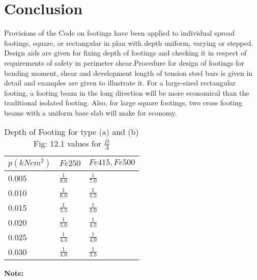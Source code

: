 \documentclass{book}
\begin{document}
\section{Conclusion}
Provisions of the Code on footings have been applied to individual spread footings, square, or rectangular in plan with depth uniform, varying or stepped. Design aids are given for ﬁxing depth of footings and checking it in respect of requirements of safety in perimeter shear.Procedure for design of footings for bending moment, shear and development length of tension steel bars is given in detail and examples are given to illustrate it. For a large-sized rectangular footing, a footing beam in the long direction will be more economical than the traditional isolated footing. Also, for large square footings, two cross footing beams with a uniform base slab will make for economy.

\begin{table}
\centering
\label{Table 12.1}
\caption{Depth of Footing for type (a) and (b) Fig: 12.1 values for $\frac{D}{A}$}
\begin{tabular}{ |p{3cm}||p{3cm}|p{3cm}|}
 \hline
 $p(kN cm^2)$ & $Fe 250$ & $Fe 415, Fe 500$\\[0.8 ex]
 \hline
 0.005 &$\frac{1}{8.0}$ &$\frac{1}{7.0}$\\[0.5 ex]
 0.010 &$\frac{1}{6.0}$ &$\frac{1}{5.5}$\\[0.5 ex]
 0.015&$\frac{1}{5.5}$ &$\frac{1}{5.0}$\\[0.5 ex]
 0.020 &$\frac{1}{5.0}$ &$\frac{1}{4.5}$\\[0.5 ex]
 0.025 &$\frac{1}{4.5}$ &$\frac{1}{4.0}$\\[0.5 ex]
 0.030 &$\frac{1}{4.0}$ &$\frac{1}{3.5}$\\[2 ex]
 \hline
  \end{tabular}
\end{table}
\textbf{Note:}
\end{document}
